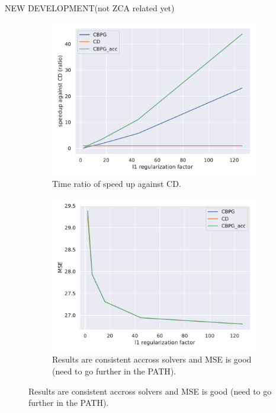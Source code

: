 \documentclass[10pt,aspectratio=43]{beamer}
\begin{document}
\begin{frame}{NEW DEVELOPMENT}{(not ZCA related yet)}
    \begin{figure}[ht!]
        \begin{subfigure}{.4\paperwidth}
            \centering
            \includegraphics[width=1.1\textwidth]{prebuilt_images/genom/genom_bigl2_ratio.pdf}
            \caption{Time ratio of speed up against CD.}
        \end{subfigure}
        \begin{subfigure}{.4\paperwidth}
            \centering
            \includegraphics[width=1.1\textwidth]{prebuilt_images/genom/genom_bigl2_MSE.pdf}
            \caption{Results are consistent accross solvers and MSE is good (need to go further in the PATH).}
        \end{subfigure}
    \end{figure}
\end{frame}
\end{document}

